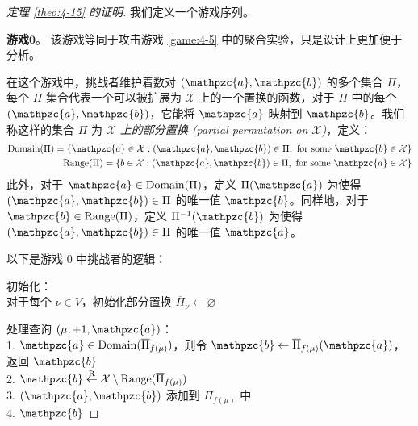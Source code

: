 \begin{proof}[定理 \ref{theo:4-15} 的证明]
我们定义一个游戏序列。

\vspace{5pt}

\noindent\textbf{游戏$\mathbf{0}$}。
该游戏等同于攻击游戏 \ref{game:4-5} 中的聚合实验，只是设计上更加便于分析。

在这个游戏中，挑战者维护着数对 $(\mathpzc{a},\mathpzc{b})$ 的多个集合 $\Pi$，每个 $\Pi$ 集合代表一个可以被扩展为 $\mathcal{X}$ 上的一个置换的函数，对于 $\Pi$ 中的每个 $(\mathpzc{a},\mathpzc{b})$，它能将 $\mathpzc{a}$ 映射到 $\mathpzc{b}$。我们称这样的集合 $\Pi$ 为 \emph{$\mathcal{X}$ 上的部分置换 (partial permutation on $\mathcal{X}$)}，定义：
\begin{align*}
	{\rm Domain}(\Pi)=\{\mathpzc{a}\in\mathcal{X}:(\mathpzc{a},\mathpzc{b})\in\Pi,~{\rm for~some~}\mathpzc{b}\in\mathcal{X}\}\\
	{\rm Range}(\Pi)=\{b\in\mathcal{X}:(\mathpzc{a},\mathpzc{b})\in\Pi,~{\rm for~some~}\mathpzc{a}\in\mathcal{X}\}
\end{align*}
此外，对于 $\mathpzc{a}\in{\rm Domain}(\Pi)$，定义 $\Pi(\mathpzc{a})$ 为使得 $(\mathpzc{a},\mathpzc{b})\in\Pi$ 的唯一值 $\mathpzc{b}$。同样地，对于 $\mathpzc{b}\in{\rm Range}(\Pi)$，定义 $\Pi^{-1}(\mathpzc{b})$ 为使得 $(\mathpzc{a},\mathpzc{b})\in\Pi$ 的唯一值 $\mathpzc{a}$。

以下是游戏 $0$ 中挑战者的逻辑：

\vspace{5pt}

\hspace*{5pt} 初始化：\\
\hspace*{50pt} 对于每个 $\nu\in V$，初始化部分置换 $\overline\Pi_\nu\leftarrow\varnothing$

\vspace{5pt}

\hspace*{5pt} 处理查询 $(\mu,+1,\mathpzc{a})$：\\
\hspace*{26pt} 1.\quad\; $\mathpzc{a}\in{\rm Domain}(\overline\Pi_{f(\mu)})$，则令 $\mathpzc{b}\leftarrow\overline\Pi_{f(\mu)}(\mathpzc{a})$，返回 $\mathpzc{b}$\\
\hspace*{26pt} 2.\quad\; $\mathpzc{b}\overset{\rm R}\leftarrow\mathcal{X}\setminus{\rm Range}(\overline\Pi_{f(\mu)})$\\
\hspace*{26pt} 3.\quad\; $(\mathpzc{a},\mathpzc{b})$ 添加到 $\overline\Pi_{f(\mu)}$ 中\\
\hspace*{26pt} 4.\quad\; $\mathpzc{b}$


\end{proof}

